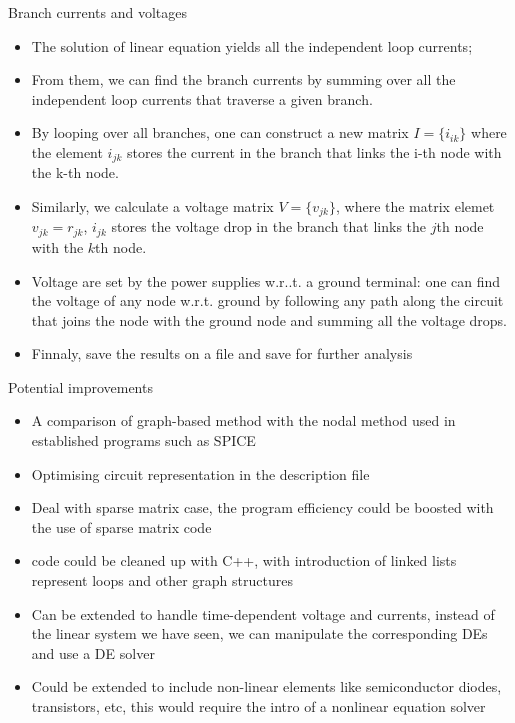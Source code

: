\documentclass[xcolor=dvipsnames]{beamer}
\begin{document}
\begin{frame}{Branch currents and voltages}
	\begin{itemize}
		\item The solution of linear equation yields all the independent loop currents;
		\item From them, we can find the branch currents by summing over all the independent loop currents that traverse a given branch.
		\item By looping over all branches, one can construct a new matrix $I=\{i_{ik}\}$ where the element $i_{jk}$ stores the current in the branch that links the i-th node with the k-th node.
		\item Similarly, we calculate a voltage matrix $V=\{v_{jk}\}$, where the matrix elemet $v_{jk} = r_{jk}$, $i_{jk}$ stores the voltage drop in the branch that links the $j$th node with the $k$th node.
		\item Voltage are set by the power supplies w.r..t. a ground terminal: one can find the voltage of any node w.r.t. ground by following any path along the circuit that joins the node with the ground node and summing all the voltage drops.
		\item Finnaly, save the results on a file and save for further analysis
	\end{itemize}
\end{frame}

\begin{frame}{ Potential improvements}
	\begin{itemize}
		\item A comparison of graph-based method with the nodal method used in established programs such as SPICE
		\item Optimising circuit representation in the description file
		\item Deal with sparse matrix case, the program efficiency could be boosted with the use of sparse matrix code
		\item code could be cleaned up with C++, with introduction of linked lists represent loops and other graph structures
		\item Can be extended to handle time-dependent voltage and currents, instead of the linear system we have seen, we can manipulate the corresponding DEs and use a DE solver
		\item Could be extended to include non-linear elements like semiconductor diodes, transistors, etc, this would require the intro of a nonlinear equation solver
	\end{itemize}
\end{frame}
\end{document}

